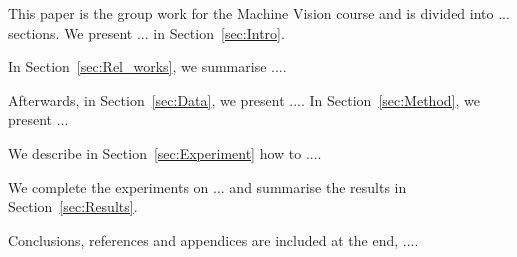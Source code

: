 This paper is the group work for the Machine Vision course and is divided into ... sections. We present ... in Section~\ref{sec:Intro}.

In Section~\ref{sec:Rel_works}, we summarise ....

Afterwards, in Section~\ref{sec:Data}, we present .... In Section~\ref{sec:Method}, we present ...

We describe in Section~\ref{sec:Experiment} how to ....

We complete the experiments on ... and summarise the results in Section~\ref{sec:Results}.

Conclusions, references and appendices are included at the end, ....



